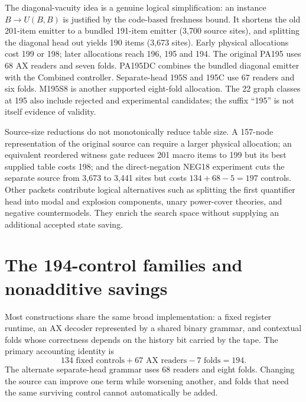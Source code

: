 \documentclass[10pt]{article}
\begin{document}
The diagonal-vacuity idea is a genuine logical simplification: an instance
\(B\to U(B,B)\) is justified by the code-based freshness bound. It shortens
the old 201-item emitter to a bundled 191-item emitter (3,700 source sites),
and splitting the diagonal head out yields 190 items (3,673 sites). Early
physical allocations cost 199 or 198; later allocations reach 196, 195 and
194. The original PA195 uses 68 AX readers and seven folds. PA195DC combines
the bundled diagonal emitter with the Combined controller. Separate-head
195S and 195C use 67 readers and six folds. M195S8 is another supported
eight-fold allocation. The 22 graph classes at 195 also include rejected and
experimental candidates; the suffix ``195'' is not itself evidence of validity.

Source-size reductions do not monotonically reduce table size. A 157-node
representation of the original source can require a larger physical allocation;
an equivalent reordered witness gate reduces 201 macro items to 199 but its
best supplied table costs 198; and the direct-negation NEG18 experiment cuts
the separate source from 3,673 to 3,441 sites but costs
\(134+68-5=197\) controls. Other packets contribute logical alternatives such
as splitting the first quantifier head into modal and explosion components,
unary power-cover theories, and negative countermodels. They enrich the search
space without supplying an additional accepted state saving.

\section{The 194-control families and nonadditive savings}

Most constructions share the same broad implementation: a fixed register
runtime, an AX decoder represented by a shared binary grammar, and contextual
folds whose correctness depends on the history bit carried by the tape.
The primary accounting identity is
\[
134\text{ fixed controls}+67\text{ AX readers}-7\text{ folds}=194.
\]
The alternate separate-head grammar uses 68 readers and eight folds. Changing
the source can improve one term while worsening another, and folds that need
the same surviving control cannot automatically be added.
\end{document}

